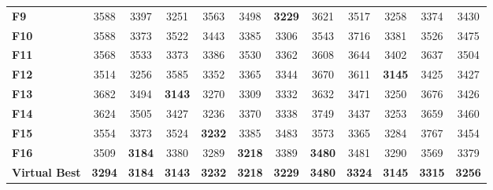 \documentclass[runningheads]{llncs}
\begin{document}
\begin{table}[bt]
\begin{center}
\begin{tabular}{|l|c|c|c|c|c|c|c|c|c|c|c|}
      \textbf{F9}          & 3588                           & 3397                           & 3251                           & 3563 & 3498                           & \textbf{3229} & 3621                           & 3517 & 3258                           & 3374 & 3430 \\
      \textbf{F10}          & 3588                           & 3373                           & 3522                           & 3443 & 3385                           & 3306                           & 3543                           & 3716 & 3381                           & 3526 & 3475 \\
      \textbf{F11}         & 3568                           & 3533                           & 3373                           & 3386 & 3530                           & 3362                           & 3608                           & 3644 & 3402                           & 3637 & 3504 \\
      \textbf{F12}         & 3514                           & 3256                           & 3585                           & 3352 & 3365                           & 3344                           & 3670                           & 3611 & \textbf{3145} & 3425 & 3427 \\
      \textbf{F13}         & 3682                           & 3494                           & \textbf{3143} & 3270 & 3309                           & 3332                           & 3632                           & 3471 & 3250                           & 3676 & 3426 \\
      \textbf{F14}         & 3624                           & 3505                           & 3427                           & 3236 & 3370                           & 3338                           & 3749                           & 3437 & 3253                           & 3659 & 3460 \\
      \textbf{F15}         & 3554                           & 3373                           & 3524                           & \textbf{3232} & 3385                           & 3483                           & 3573                           & 3365 & 3284                           & 3767 & 3454 \\
      \textbf{F16}         & 3509                           & \textbf{3184} & 3380                           & 3289 & \textbf{3218} & 3389                           & \textbf{3480} & 3481 & 3290                           & 3569 & 3379 \\ %
      \textbf{Virtual Best} & \textbf{3294}                           & \textbf{3184} & \textbf{3143}                           & \textbf{3232} & \textbf{3218} & \textbf{3229}                           & \textbf{3480} & \textbf{3324} & \textbf{3145}                           & \textbf{3315} & \textbf{3256} \\
\hline
      \end{tabular}
  \end{center}
\end{table}
\end{document}

